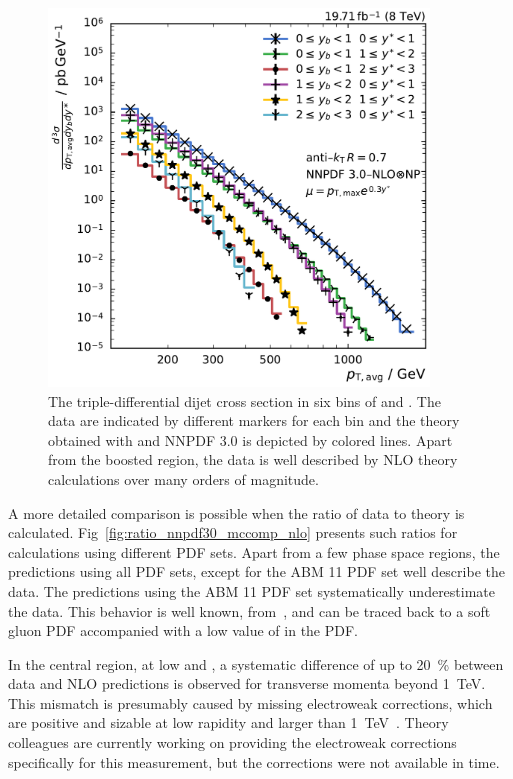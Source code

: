 \begin{figure}[h!tbp]
    \centering
    \includegraphics[width=0.9\textwidth]{figures/measurement/ptavg_spectrum.pdf}\hfill
    \caption[Spectrum of the triple-differential dijet cross section]{The
    triple-differential dijet cross section in six bins of \ystar and \yboost. The
    data are indicated by different markers for each bin and the theory obtained
    with \NLOJETPP and NNPDF 3.0 is depicted by colored lines. Apart from the
    boosted region, the data is well described by NLO theory calculations over many orders of magnitude.}
    \label{fig:measurement_result}
\end{figure}

A more detailed comparison is possible when the ratio of data to theory is
calculated. Fig~\ref{fig:ratio_nnpdf30_mccomp_nlo} presents
such ratios for calculations using different PDF sets. Apart
from a few phase space regions, the predictions using all PDF sets, except for
the ABM 11 PDF set well describe the data. The predictions using the ABM 11 PDF
set systematically underestimate the data. This behavior is well known, \eg
from~\cite{Khachatryan:2014waa,Stober:2012abc}, and can be traced back to a
soft gluon PDF accompanied with a low value of \asmz in the PDF.

In the central region, at low \yboost and \ystar, a systematic difference of up
to \SI{20}{\percent} between data and NLO predictions is observed for transverse
momenta beyond \SI{1}{\TeV}. This mismatch is presumably caused by missing electroweak
corrections, which are positive and sizable at low rapidity and \pt larger
than \SI{1}{\TeV}~\cite{Khachatryan:2014waa}. Theory colleagues are currently working on providing the
electroweak corrections specifically for this measurement, but the corrections
were not available in time.

